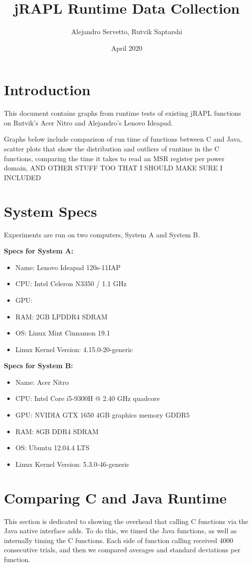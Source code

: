 \documentclass{article}
\title{jRAPL Runtime Data Collection}
\author{Alejandro Servetto, Rutvik Saptarshi}
\date{April 2020}
\begin{document}
\maketitle

\section{Introduction}
This document contains graphs from runtime tests of existing jRAPL functions on Rutvik's Acer Nitro and Alejandro's Lenovo Ideapad.

Graphs below include comparison of run time of functions between C and Java, scatter plots that show the distribution and outliers of runtime in the C functions, comparing the time it takes to read an MSR register per power domain, AND OTHER STUFF TOO THAT I SHOULD MAKE SURE I INCLUDED

\section{System Specs}
Experiments are run on two computers, System A and System B.

\textbf{Specs for System A:}
\begin{itemize}
    \item Name: Lenovo Ideapad 120s-11IAP
    \item CPU: Intel Celeron N3350 / 1.1 GHz
    \item GPU: 
    \item RAM: 2GB LPDDR4 SDRAM
    \item OS: Linux Mint Cinnamon 19.1
    \item Linux Kernel Version: 4.15.0-20-generic
\end{itemize}
    
\textbf{Specs for System B:}
\begin{itemize}
    \item Name: Acer Nitro
    \item CPU: Intel Core i5-9300H @ 2.40 GHz quadcore
    \item GPU: NVIDIA GTX 1650 4GB graphics memory GDDR5
    \item RAM: 8GB DDR4 SDRAM
    \item OS: Ubuntu 12.04.4 LTS
    \item Linux Kernel Version: 5.3.0-46-generic
\end{itemize}


\section{Comparing C and Java Runtime}
This section is dedicated to showing the overhead that calling C functions via the Java native interface adds. To do this, we timed the Java functions, as well as internally timing the C functions. Each side of function calling received 4000 consecutive trials, and then we compared averages and standard deviations per function.
\end{document}
